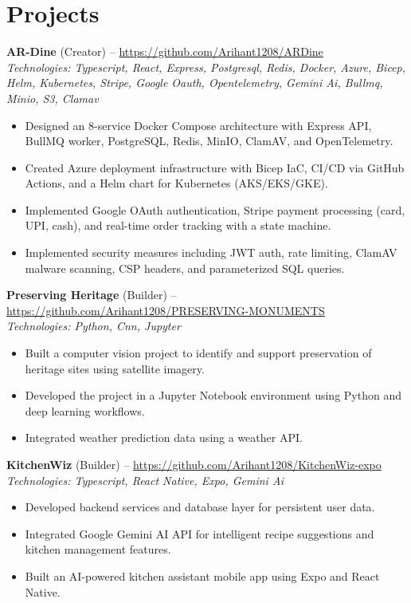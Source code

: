 \documentclass[11pt,a4paper]{article}
\begin{document}
\section{Projects}
\textbf{AR-Dine} (Creator) -- \href{https://github.com/Arihant1208/ARDine}{https://github.com/Arihant1208/ARDine}
\\ \textit{Technologies: Typescript, React, Express, Postgresql, Redis, Docker, Azure, Bicep, Helm, Kubernetes, Stripe, Google Oauth, Opentelemetry, Gemini Ai, Bullmq, Minio, S3, Clamav}
\begin{itemize}
  \item Designed an 8-service Docker Compose architecture with Express API, BullMQ worker, PostgreSQL, Redis, MinIO, ClamAV, and OpenTelemetry.
  \item Created Azure deployment infrastructure with Bicep IaC, CI/CD via GitHub Actions, and a Helm chart for Kubernetes (AKS/EKS/GKE).
  \item Implemented Google OAuth authentication, Stripe payment processing (card, UPI, cash), and real-time order tracking with a state machine.
  \item Implemented security measures including JWT auth, rate limiting, ClamAV malware scanning, CSP headers, and parameterized SQL queries.
\end{itemize}
\vspace{2pt}
\textbf{Preserving Heritage} (Builder) -- \href{https://github.com/Arihant1208/PRESERVING-MONUMENTS}{https://github.com/Arihant1208/PRESERVING-MONUMENTS}
\\ \textit{Technologies: Python, Cnn, Jupyter}
\begin{itemize}
  \item Built a computer vision project to identify and support preservation of heritage sites using satellite imagery.
  \item Developed the project in a Jupyter Notebook environment using Python and deep learning workflows.
  \item Integrated weather prediction data using a weather API.
\end{itemize}
\vspace{2pt}
\textbf{KitchenWiz} (Builder) -- \href{https://github.com/Arihant1208/KitchenWiz-expo}{https://github.com/Arihant1208/KitchenWiz-expo}
\\ \textit{Technologies: Typescript, React Native, Expo, Gemini Ai}
\begin{itemize}
  \item Developed backend services and database layer for persistent user data.
  \item Integrated Google Gemini AI API for intelligent recipe suggestions and kitchen management features.
  \item Built an AI-powered kitchen assistant mobile app using Expo and React Native.
\end{itemize}
\vspace{2pt}
\end{document}
